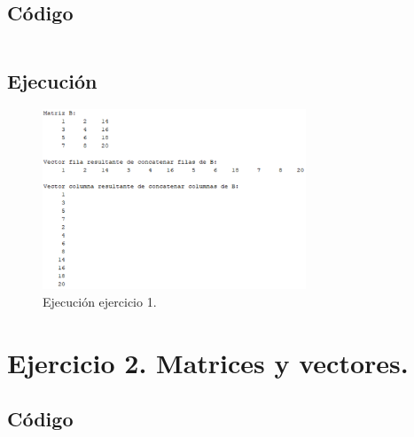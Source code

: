 \documentclass[a4paper, 12pt]{article}
\begin{document}
	\subsection{Código}
	\inputminted[fontsize=\scriptsize, linenos, breaklines=true, xleftmargin=0.75cm, frame=lines]{matlab}{code/Ejercicio1.m}
	\subsection{Ejecución}
	\begin{figure}[htp!]
		\centering
		\includegraphics[width=0.7\textwidth]{figures/ejc1.png}
		\caption{Ejecución ejercicio 1.}
	\end{figure}
	
	\section{Ejercicio 2. Matrices y vectores.}
	
	\subsection{Código}
	\inputminted[fontsize=\scriptsize, linenos, breaklines=true, xleftmargin=0.75cm, frame=lines]{matlab}{code/Ejercicio2.m}
\end{document}
